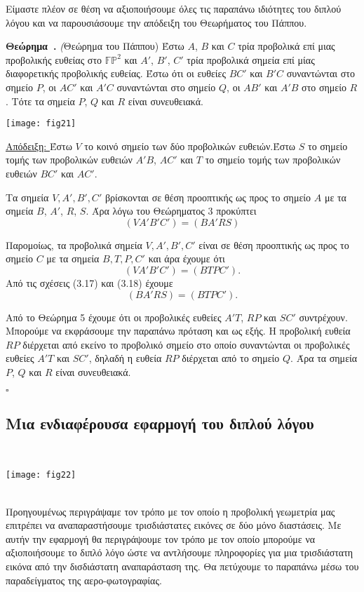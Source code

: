 \documentclass[12pt, a4paper]{book}
\newcounter{theorem}[section]
\newenvironment{theorem}[1][]{\refstepcounter{theorem}\par\medskip
   \textbf{Θεώρημα~\thetheorem. #1} \rmfamily}{\medskip}
\begin{document}
Είμαστε πλέον σε θέση να αξιοποιήσουμε όλες τις παραπάνω ιδιότητες του διπλού λόγου και να παρουσιάσουμε την απόδειξη του Θεωρήματος του Πάππου.

\begin{theorem}\emph(Θεώρημα του Πάππου)
Έστω $A$, $B$ και $C$ τρία προβολικά επί μιας προβολικής ευθείας στο $\mathbb{F}\mathbb{P}^2$ και $A'$, $B'$, $C'$ τρία προβολικά σημεία επί μίας διαφορετικής προβολικής ευθείας. Έστω ότι οι ευθείες $BC'$ και $B'C$ συναντώνται στο σημείο $P$, οι $AC'$ και $A'C$ συναντώνται στο σημείο $Q$, οι $AB'$ και $A'B$ στο σημείο $R$. Τότε τα σημεία $P$, $Q$ και $R$ είναι συνευθειακά.
\end{theorem}
\begin{center}
\texttt{[image: fig21]}
\end{center}

\underline{Απόδειξη: } Έστω $V$ το κοινό σημείο των δύο προβολικών ευθειών.Έστω $S$ το σημείο τομής των προβολικών ευθειών $A'B$, $AC'$ και $T$ το σημείο τομής των προβολικών ευθειών $BC'$ και $AC'$.

Τα σημεία $V, A', B', C'$ βρίσκονται σε θέση προοπτικής ως προς το σημείο $A$ με τα σημεία $B$, $A'$, $R$, $S$. Άρα λόγω του Θεώρηματος 3 προκύπτει
\begin{equation}
(VA'B'C')=(BA'RS)
\end{equation}

Παρομοίως, τα προβολικά σημεία $V, A', B', C'$ είναι σε θέση προοπτικής ως προς το σημείο $C$ με τα σημεία $B, T, P, C'$ και άρα έχουμε ότι
\begin{equation}
(VA'B'C')=(BTPC').
\end{equation}
Από τις σχέσεις (3.17) και (3.18) έχουμε 
\begin{displaymath}
(BA'RS)=(BTPC').
\end{displaymath}

Από το Θεώρημα 5 έχουμε ότι οι προβολικές ευθείες $A'T$, $RP$ και $SC'$ συντρέχουν. Μπορούμε να εκφράσουμε την παραπάνω πρόταση και ως εξής. Η προβολική ευθεία $RP$ διέρχεται από εκείνο το προβολικό σημείο στο οποίο συναντώνται οι προβολικές ευθείες $A'T$ και $SC'$, δηλαδή η ευθεία $RP$ διέρχεται από το  σημείο $Q$. Άρα τα σημεία $P$, $Q$ και $R$ είναι συνευθειακά.
  \begin{flushright}
  $\square$
  \end{flushright}
  
\subsection{Μια ενδιαφέρουσα εφαρμογή του διπλού λόγου}
\text{ }\\
\begin{center}
\texttt{[image: fig22]}
\end{center}
\text{ }\\
Προηγουμένως περιγράψαμε τον τρόπο με τον οποίο η προβολική γεωμετρία μας επιτρέπει να αναπαραστήσουμε τρισδιάστατες εικόνες σε δύο μόνο διαστάσεις. Με αυτήν την εφαρμογή θα περιγράψουμε τον τρόπο με τον οποίο μπορούμε να αξιοποιήσουμε το διπλό λόγο ώστε να αντλήσουμε πληροφορίες για μια τρισδιάστατη εικόνα από την δισδιάστατη αναπαράσταση της. Θα πετύχουμε το παραπάνω μέσω του παραδείγματος της αερο-φωτογραφίας.
\end{document}
